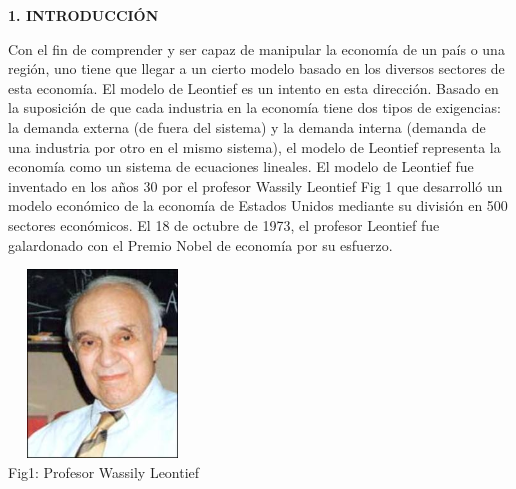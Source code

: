\documentclass[10pt,a4paper]{article}
\begin{document}
\begin{multicols}{2}
\begin{center}
{\large \bf 1. INTRODUCCI\'ON}
\end{center}
 Con el fin de comprender y ser capaz de manipular la economía de un país o una región, uno tiene que llegar a un cierto modelo basado en los diversos sectores de esta economía. El modelo de Leontief es un intento en esta dirección. Basado en la suposición de que cada industria en la economía tiene dos tipos de exigencias: la demanda externa (de fuera del sistema) y la demanda interna (demanda de una industria por otro en el mismo sistema), el modelo de Leontief representa la economía como un sistema de ecuaciones lineales. El modelo de Leontief fue inventado en los años 30 por el profesor Wassily Leontief \color{blue} Fig 1 \color{black} que desarrolló un modelo económico de la economía de Estados Unidos mediante su división en 500 sectores económicos. El 18 de octubre de 1973, el profesor Leontief fue galardonado con el Premio Nobel de economía por su esfuerzo.\\
 
\begin{center}
	
	
	\centering
	\includegraphics[width=5cm,height=5cm]{leontief.jpg}
	\\
	Fig1: Profesor Wassily Leontief
\end{center}


\end{multicols}
\end{document}
